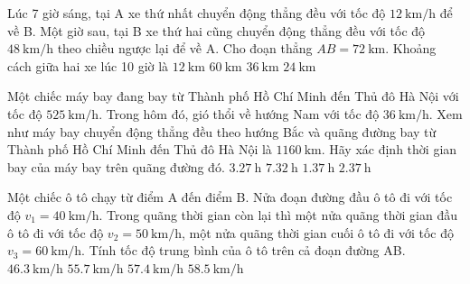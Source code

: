 \begin{ex}
	Lúc 7 giờ sáng, tại A xe thứ nhất chuyển động thẳng đều với tốc độ $\SI{12}{\kilo\meter/\hour}$ để về B. Một giờ sau, tại B xe thứ hai cũng chuyển động thẳng đều với tốc độ $\SI{48}{\kilo\meter/\hour}$ theo chiều ngược lại để về A. Cho đoạn thẳng $AB=\SI{72}{\kilo\meter}$. Khoảng cách giữa hai xe lúc 10 giờ là
	\choice
	{$\SI{12}{\kilo\meter}$}
	{\True $\SI{60}{\kilo\meter}$}
	{$\SI{36}{\kilo\meter}$}
	{$\SI{24}{\kilo\meter}$}
\end{ex}

\begin{ex}
	Một chiếc máy bay đang bay từ Thành phố Hồ Chí Minh đến Thủ đô Hà Nội với tốc độ $\SI{525}{\kilo\meter/\hour}$. Trong hôm đó, gió thổi về hướng Nam với tốc độ $\SI{36}{\kilo\meter/\hour}$. Xem như máy bay chuyển động thẳng đều theo hướng Bắc và quãng đường bay từ Thành phố Hồ Chí Minh đến Thủ đô Hà Nội là $\SI{1160}{\kilo\meter}$. Hãy xác định thời gian bay của máy bay trên quãng đường đó.
	\choice
	{$\SI{3,27}{\hour}$}
	{$\SI{7,32}{\hour}$}
	{$\SI{1,37}{\hour}$}
	{\True $\SI{2,37}{\hour}$}
\end{ex}

\begin{ex}
	Một chiếc ô tô chạy từ điểm A đến điểm B. Nửa đoạn đường đầu ô tô đi với tốc độ $v_1=\SI{40}{\kilo\meter/\hour}$. Trong quãng thời gian còn lại thì một nửa quãng thời gian đầu ô tô đi với tốc độ $v_2=\SI{50}{\kilo\meter/\hour}$, một nửa quãng thời gian cuối ô tô đi với tốc độ $v_3=\SI{60}{\kilo\meter/\hour}$. Tính tốc độ trung bình của ô tô trên cả đoạn đường AB.
	\choice
	{\True $\SI{46.3}{\kilo\meter/\hour}$}
	{$\SI{55.7}{\kilo\meter/\hour}$}
	{$\SI{57.4}{\kilo\meter/\hour}$}
	{$\SI{58.5}{\kilo\meter/\hour}$}
	\loigiai{}
\end{ex}

